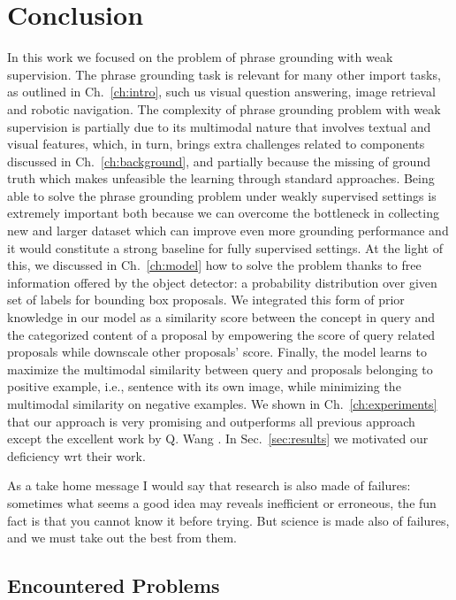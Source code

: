 \chapter{Conclusion}
\label{conclusion}

In this work we focused on the problem of phrase grounding with weak
supervision. The phrase grounding task is relevant for many other
import tasks, as outlined in Ch.~\ref{ch:intro}, such us visual
question answering, image retrieval and robotic navigation. The
complexity of phrase grounding problem with weak supervision is
partially due to its multimodal nature that involves textual and
visual features, which, in turn, brings extra challenges related to
components discussed in Ch.~\ref{ch:background}, and partially because
the missing of ground truth which makes unfeasible the learning
through standard approaches. Being able to solve the phrase grounding
problem under weakly supervised settings is extremely important both
because we can overcome the bottleneck in collecting new and larger
dataset which can improve even more grounding performance and it would
constitute a strong baseline for fully supervised settings. At the
light of this, we discussed in Ch.~\ref{ch:model} how to solve the
problem thanks to free information offered by the object detector: a
probability distribution over given set of labels for bounding box
proposals. We integrated this form of prior knowledge in our model as
a similarity score between the concept in query and the categorized
content of a proposal by empowering the score of query related
proposals while downscale other proposals' score. Finally, the model
learns to maximize the multimodal similarity between query and
proposals belonging to positive example, i.e., sentence with its own
image, while minimizing the multimodal similarity on negative
examples. We shown in Ch.~\ref{ch:experiments} that our approach is
very promising and outperforms all previous approach except the
excellent work by Q. Wang \etal{} \cite{wang2020maf}. In
Sec.~\ref{sec:results} we motivated our deficiency wrt
their work. 

As a take home message I would say that research is also made of
failures: sometimes what seems a good idea may reveals inefficient or
erroneous, the fun fact is that you cannot know it before trying. But
science is made also of failures, and we must take out the best from
them.

\section{Encountered Problems}

